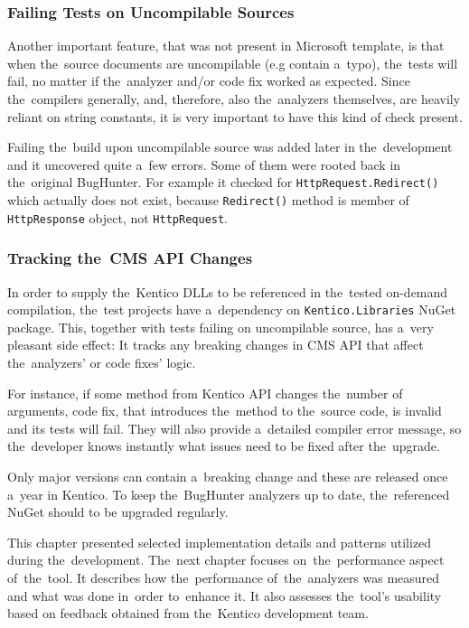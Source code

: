 \documentclass[
  digital, %
  table,   %
  lof,     %
  lot,     %
  oneside,
]{fithesis3}
\begin{document}
\subsubsection{\textbf{Failing Tests on Uncompilable Sources}}
Another important feature, that was not present in Microsoft template, is that when the~source documents are uncompilable (e.g contain a~typo), the~tests will fail, no matter if the~analyzer and/or code fix worked as expected. Since the~compilers generally, and, therefore, also the~analyzers themselves, are heavily reliant on string constants, it is very important to have this kind of check present.

Failing the~build upon uncompilable source was added later in the~development and it uncovered quite a~few errors. Some of them were rooted back in the~original BugHunter. For example it checked for \texttt{HttpRequest.Redirect()} which actually does not exist, because \texttt{Redirect()} method is member of \texttt{HttpResponse} object, not \texttt{HttpRequest}.

\subsubsection{\textbf{Tracking the~CMS API Changes}}
In order to supply the~Kentico DLLs to be referenced in the~tested on-demand compilation, the~test projects have a~dependency on \texttt{Kentico.Libraries} NuGet package. This, together with tests failing on uncompilable source, has a~very pleasant side effect: It tracks any breaking changes in CMS API that affect the~analyzers' or code fixes' logic.

For instance, if some method from Kentico API changes the~number of arguments, code fix, that introduces the~method to the~source code, is invalid and its tests will fail. They will also provide a~detailed compiler error message, so the~developer knows instantly what issues need to be fixed after the~upgrade.

Only major versions can contain a~breaking change and these are released once a~year in Kentico. To keep the~BugHunter analyzers up to date, the~referenced NuGet should to be upgraded regularly.

\bigskip\noindent
This chapter presented selected implementation details and patterns utilized during the~development. The~next chapter focuses on~the~performance aspect of~the~tool. It describes how the~performance of~the~analyzers was measured and what was done in~order to~enhance it. It also assesses the~tool's usability based on feedback obtained from the~Kentico development team.
\end{document}
